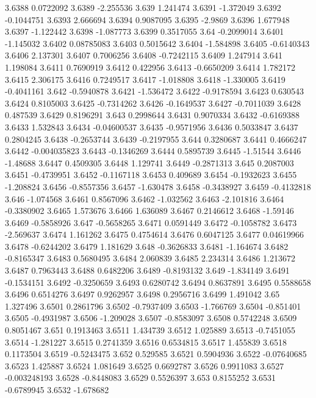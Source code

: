 3.6388  0.0722092
3.6389  -2.255536
3.639  1.241474
3.6391  -1.372049
3.6392  -0.1044751
3.6393  2.666694
3.6394  0.9087095
3.6395  -2.9869
3.6396  1.677948
3.6397  -1.122442
3.6398  -1.087773
3.6399  0.3517055
3.64  -0.2099014
3.6401  -1.145032
3.6402  0.08785083
3.6403  0.5015642
3.6404  -1.584898
3.6405  -0.6140343
3.6406  2.137301
3.6407  0.7006256
3.6408  -0.7242115
3.6409  1.247914
3.641  1.198084
3.6411  0.7690919
3.6412  0.422956
3.6413  -0.6650209
3.6414  1.782172
3.6415  2.306175
3.6416  0.7249517
3.6417  -1.018808
3.6418  -1.330005
3.6419  -0.4041161
3.642  -0.5940878
3.6421  -1.536472
3.6422  -0.9178594
3.6423  0.630543
3.6424  0.8105003
3.6425  -0.7314262
3.6426  -0.1649537
3.6427  -0.7011039
3.6428  0.487539
3.6429  0.8196291
3.643  0.2998644
3.6431  0.9070334
3.6432  -0.6169388
3.6433  1.532843
3.6434  -0.04600537
3.6435  -0.9571956
3.6436  0.5033847
3.6437  0.2804245
3.6438  -0.2653744
3.6439  -0.2197955
3.644  0.3280687
3.6441  0.4666247
3.6442  -0.004035823
3.6443  -0.1346269
3.6444  0.5895739
3.6445  -1.51544
3.6446  -1.48688
3.6447  0.4509305
3.6448  1.129741
3.6449  -0.2871313
3.645  0.2087003
3.6451  -0.4739951
3.6452  -0.1167118
3.6453  0.409689
3.6454  -0.1932623
3.6455  -1.208824
3.6456  -0.8557356
3.6457  -1.630478
3.6458  -0.3438927
3.6459  -0.4132818
3.646  -1.074568
3.6461  0.8567096
3.6462  -1.032562
3.6463  -2.101816
3.6464  -0.3380902
3.6465  1.573676
3.6466  1.636089
3.6467  0.2146612
3.6468  -1.59146
3.6469  -0.5858926
3.647  -0.5658265
3.6471  0.0591449
3.6472  -0.1058782
3.6473  -2.569637
3.6474  1.161262
3.6475  0.4754614
3.6476  0.6047125
3.6477  0.04619966
3.6478  -0.6244202
3.6479  1.181629
3.648  -0.3626833
3.6481  -1.164674
3.6482  -0.8165347
3.6483  0.5680495
3.6484  2.060839
3.6485  2.234314
3.6486  1.213672
3.6487  0.7963443
3.6488  0.6482206
3.6489  -0.8193132
3.649  -1.834149
3.6491  -0.1534151
3.6492  -0.3250659
3.6493  0.6280742
3.6494  0.8637891
3.6495  0.5588658
3.6496  0.6514276
3.6497  0.9262957
3.6498  0.2956716
3.6499  1.491042
3.65  1.327496
3.6501  0.2861796
3.6502  -0.7937409
3.6503  -1.766769
3.6504  -0.851401
3.6505  -0.4931987
3.6506  -1.209028
3.6507  -0.8583097
3.6508  0.5742248
3.6509  0.8051467
3.651  0.1913463
3.6511  1.434739
3.6512  1.025889
3.6513  -0.7451055
3.6514  -1.281227
3.6515  0.2741359
3.6516  0.6534815
3.6517  1.455839
3.6518  0.1173504
3.6519  -0.5243475
3.652  0.529585
3.6521  0.5904936
3.6522  -0.07640685
3.6523  1.425887
3.6524  1.081649
3.6525  0.6692787
3.6526  0.9911083
3.6527  -0.003248193
3.6528  -0.8448083
3.6529  0.5526397
3.653  0.8155252
3.6531  -0.6789945
3.6532  -1.678682

